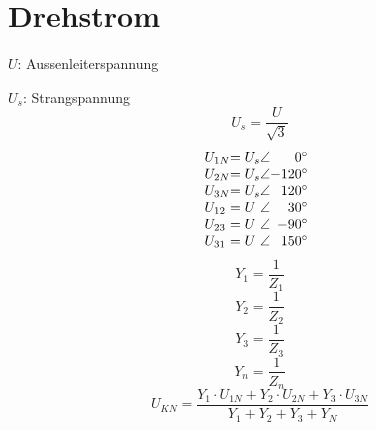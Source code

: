 



\chapter{Drehstrom}
\newpage
%
%
$U$: Aussenleiterspannung

$U_s$: Strangspannung
\[ U_s = \frac{U}{\sqrt{3}} \]
\[ \begin{array}{@{}l@{}l@{}l@{}r}
U_{1N} &= U_s &\angle &   0^\circ \\
U_{2N} &= U_s &\angle &-120^\circ \\
U_{3N} &= U_s &\angle & 120^\circ \\
U_{12} &= U   &\angle &  30^\circ \\
U_{23} &= U   &\angle & -90^\circ \\
U_{31} &= U   &\angle & 150^\circ 
\end{array} \]
\[ Y_1 = \frac{1}{Z_1} \]
\[ Y_2 = \frac{1}{Z_2} \]
\[ Y_3 = \frac{1}{Z_3} \]
\[ Y_n = \frac{1}{Z_n} \]
\[ U_{KN} = \frac{Y_1 \cdot U_{1N} + Y_2 \cdot U_{2N} + Y_3 \cdot U_{3N}}
{Y_1 + Y_2 + Y_3 + Y_N} \]